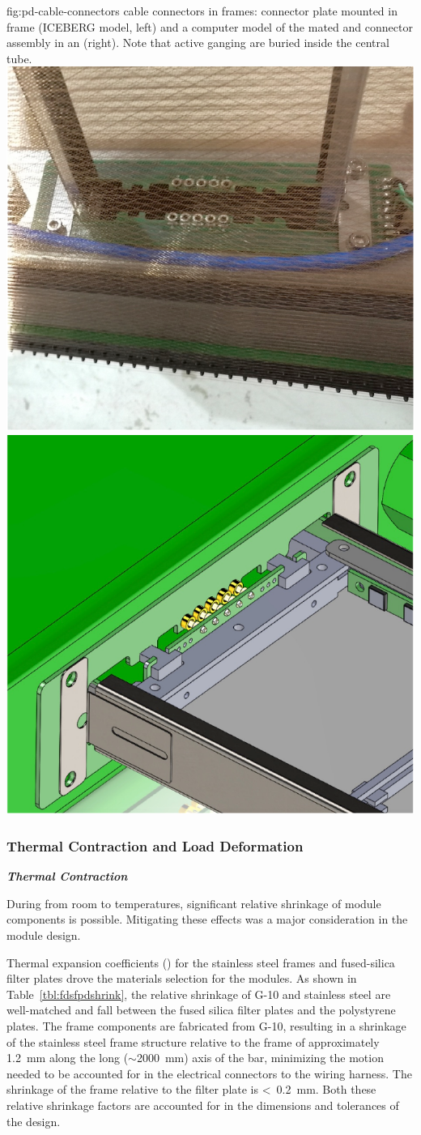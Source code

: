 \begin{dunefigure}{fig:pd-cable-connectors}
{ cable connectors in  frames:  connector plate mounted in  frame (ICEBERG model, left) and a computer model of the mated  and connector assembly in an  (right).  Note that active ganging  are buried inside the central tube.}
	\includegraphics[height=6.cm]{graphics/pds-connector-mounted-in-apa.pdf}
	\includegraphics[height=6.cm]{graphics/pds-connector-assembly-in-apa.pdf}
\end{dunefigure}

\subsubsection{Thermal Contraction and Load Deformation}
\label{sssec:pds-thermal-load}
\textit{\bf Thermal Contraction}

During \cooldown from room 
to  temperatures,  significant relative shrinkage of module components is possible.  Mitigating these effects was a major consideration in the  module design.

Thermal expansion coefficients () for the stainless steel  frames and fused-silica filter plates drove the materials selection for the  modules.  As shown in Table~\ref{tbl:fdsfpdshrink},  the relative shrinkage of \frfour G-10 and stainless steel are well-matched and fall between the fused silica filter plates and the polystyrene  plates. The frame components are fabricated from \frfour G-10, resulting in a shrinkage of the stainless steel frame structure relative to the frame of approximately \SI{1.2}{mm} along the long ($\sim$\SI{2000}{mm}) axis of the bar, minimizing the motion needed to be accounted for in the electrical connectors to the wiring harness.  The shrinkage of the frame relative to the filter plate is <~\SI{0.2}{mm}.  Both these relative shrinkage factors are accounted for in the dimensions and tolerances of the design.

